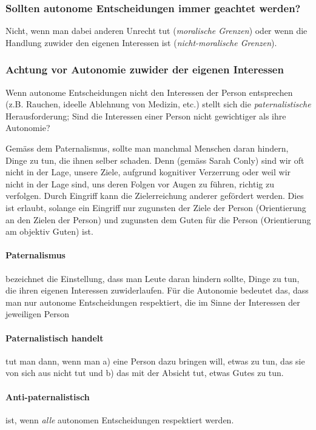 \documentclass[../main.tex]{subfiles}
\begin{document}
\subsubsection{Sollten autonome Entscheidungen immer geachtet werden?}
Nicht, wenn man dabei anderen Unrecht tut (\textit{moralische Grenzen}) oder wenn die Handlung zuwider den eigenen Interessen ist (\textit{nicht-moralische Grenzen}).

\subsubsection{Achtung vor Autonomie zuwider der eigenen Interessen}
Wenn autonome Entscheidungen nicht den Interessen der Person entsprechen (z.B. Rauchen, ideelle Ablehnung von Medizin, etc.) stellt sich die \textit{paternalistische} Herausforderung; Sind die Interessen einer Person nicht gewichtiger als ihre Autonomie?

Gemäss dem Paternalismus, sollte man manchmal Menschen daran hindern, Dinge zu tun, die ihnen selber schaden. Denn (gemäss Sarah Conly) sind wir oft nicht in der Lage, unsere Ziele, aufgrund kognitiver Verzerrung oder weil wir nicht in der Lage sind, uns deren Folgen vor Augen zu führen, richtig zu verfolgen. Durch Eingriff kann die Zielerreichung anderer gefördert werden. Dies ist erlaubt, solange ein Eingriff nur zugunsten der Ziele der Person (Orientierung an den Zielen der Person) und zugunsten dem Guten für die Person (Orientierung am objektiv Guten) ist. 

\paragraph{Paternalismus} bezeichnet die Einstellung, dass man Leute daran hindern sollte, Dinge zu tun, die ihren eigenen Interessen zuwiderlaufen. Für die Autonomie bedeutet das, dass man nur autonome Entscheidungen respektiert, die im Sinne der Interessen der jeweiligen Person 
\paragraph{Paternalistisch handelt} tut man dann, wenn man a) eine Person dazu bringen will, etwas zu tun, das sie von sich aus nicht tut und b) das mit der Absicht tut, etwas Gutes zu tun.
\paragraph{Anti-paternalistisch} ist, wenn \textit{alle} autonomen Entscheidungen respektiert werden.
\end{document}
